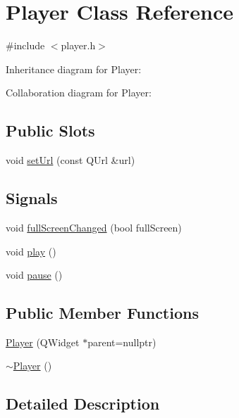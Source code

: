 \hypertarget{class_player}{}\section{Player Class Reference}
\label{class_player}


{\ttfamily \#include $<$player.\+h$>$}



Inheritance diagram for Player\+:


Collaboration diagram for Player\+:
\subsection*{Public Slots}
\begin{DoxyCompactItemize}
\item 
void \mbox{\hyperlink{class_player_a85dda573e6b2b5f4f7bdf930b0c496f4}{set\+Url}} (const Q\+Url \&url)
\end{DoxyCompactItemize}
\subsection*{Signals}
\begin{DoxyCompactItemize}
\item 
void \mbox{\hyperlink{class_player_a347d0b06b378c3022dc224f3799243f4}{full\+Screen\+Changed}} (bool full\+Screen)
\item 
void \mbox{\hyperlink{class_player_a8cd819ec3812c26e038e74426bc2b90f}{play}} ()
\item 
void \mbox{\hyperlink{class_player_aa7749254cf909d029127d4622670c522}{pause}} ()
\end{DoxyCompactItemize}
\subsection*{Public Member Functions}
\begin{DoxyCompactItemize}
\item 
\mbox{\hyperlink{class_player_a9254d78bab5919f1ce71366b498791a5}{Player}} (Q\+Widget $\ast$parent=nullptr)
\item 
\mbox{\hyperlink{class_player_a749d2c00e1fe0f5c2746f7505a58c062}{$\sim$\+Player}} ()
\end{DoxyCompactItemize}


\subsection{Detailed Description}



